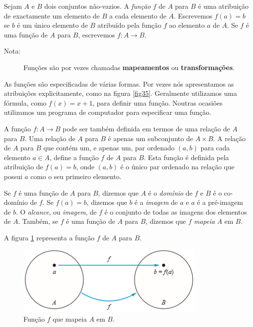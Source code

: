\begin{defn}
\label{def315}
Sejam $A$ e $B$ dois conjuntos não-vazios. A \emph{função} $f$ de $A$ para $B$ é
uma atribuição de exactamente um elemento de $B$ a cada elemento de $A$.
Escrevemos $f(a) = b$ se $b$ é um único elemento de $B$ atribuído pela função
$f$ ao elemento $a$ de $A$. Se $f$ é uma função de $A$ para $B$, escrevemos
$f:A \to B$.
\end{defn}

\begin{description}
\item[Nota:]Funções são por vezes chamadas \textbf{mapeamentos} ou
\textbf{transformações}.
\end{description}

As funções são especificadas de várias formas. Por vezes nós apresentamos as
atribuições explicitamente, como na figura \ref{fig35}. Geralmente utilizamos
uma fórmula, como $f(x)=x+1$, para definir uma função. Noutras ocasiões
utilizamos um programa de computador para especificar uma função.

A função $f:A \to B$ pode ser também definida em termos de uma relação de $A$
para $B$. Uma relação de $A$ para $B$ é apenas um subconjunto de $A \times B$. A
relação de $A$ para $B$ que contém um, e apenas um, par ordenado $(a,b)$ para
cada elemento $a \in A$, define a função $f$ de $A$ para $B$. Esta função é
definida pela atribuição de $f(a)=b$, onde $(a,b)$ é o único par ordenado na
relação que possui $a$ como o seu primeiro elemento.

\begin{defn}
\label{def316}
Se $f$ é uma função de $A$ para $B$, dizemos que $A$ é o \emph{domínio} de $f$ e
$B$ é o co-domínio de $f$. Se $f(a)=b$, dizemos que $b$ é a \emph{imagem} de $a$
e $a$ é a pré-imagem de $b$. O \emph{alcance}, ou \emph{imagem}, de $f$ é o
conjunto de todas as imagens dos elementos de $A$. Também, se $f$ é uma função
de $A$ para $B$, dizemos que $f$ \emph{mapeia} $A$ em $B$.
\end{defn}

A figura \ref{fig36} representa a função $f$ de $A$ para $B$.

\begin{figure}[H]
	\centering
	\includegraphics[scale=2]{chapter/imagens/36}
	\caption{Função $f$ que mapeia $A$ em $B$.}
	\label{fig36}
\end{figure}

